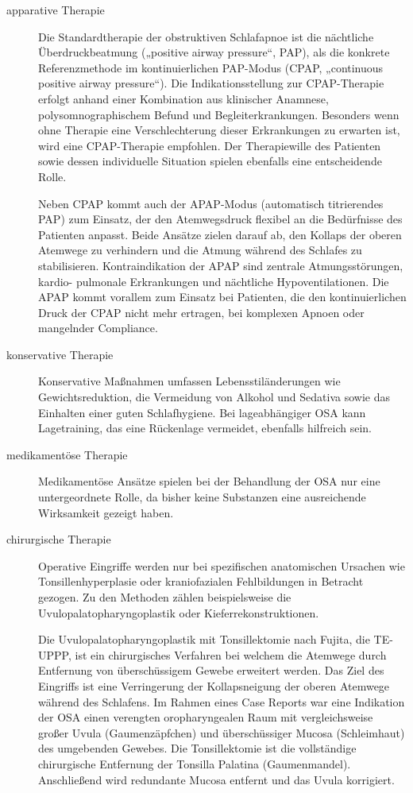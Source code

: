 \documentclass[a4paper, 12pt]{article}
\begin{document}
\begin{description}
    \item[apparative Therapie] Die Standardtherapie der obstruktiven Schlafapnoe ist die nächtliche Überdruckbeatmung („positive airway pressure“, PAP), als die konkrete Referenzmethode im kontinuierlichen PAP-Modus (CPAP, „continuous positive airway pressure“). Die Indikationsstellung zur CPAP-Therapie erfolgt anhand einer Kombination aus klinischer Anamnese, polysomnographischem Befund und Begleiterkrankungen. Besonders wenn ohne Therapie eine Verschlechterung dieser Erkrankungen zu erwarten ist, wird eine CPAP-Therapie empfohlen. Der Therapiewille des Patienten sowie dessen individuelle Situation spielen ebenfalls eine entscheidende Rolle.
    
    Neben CPAP kommt auch der APAP-Modus (automatisch titrierendes PAP) zum Einsatz, der den Atemwegsdruck flexibel an die Bedürfnisse des Patienten anpasst. Beide Ansätze zielen darauf ab, den Kollaps der oberen Atemwege zu verhindern und die Atmung während des Schlafes zu stabilisieren. Kontraindikation der APAP sind zentrale Atmungsstörungen, kardio- pulmonale Erkrankungen und nächtliche Hypoventilationen. Die APAP kommt vorallem zum Einsatz bei Patienten, die den kontinuierlichen Druck der CPAP nicht mehr ertragen, bei komplexen Apnoen oder mangelnder Compliance. 

    \item[konservative Therapie] Konservative Maßnahmen umfassen Lebensstiländerungen wie Gewichtsreduktion, die Vermeidung von Alkohol und Sedativa sowie das Einhalten einer guten Schlafhygiene. Bei lageabhängiger OSA kann Lagetraining, das eine Rückenlage vermeidet, ebenfalls hilfreich sein.

    \item[medikamentöse Therapie] Medikamentöse Ansätze spielen bei der Behandlung der OSA nur eine untergeordnete Rolle, da bisher keine Substanzen eine ausreichende Wirksamkeit gezeigt haben.

    \item[chirurgische Therapie] Operative Eingriffe werden nur bei spezifischen anatomischen Ursachen wie Tonsillenhyperplasie oder kraniofazialen Fehlbildungen in Betracht gezogen. Zu den Methoden zählen beispielsweise die Uvulopalatopharyngoplastik oder Kieferrekonstruktionen. 
    
    Die Uvulopalatopharyngoplastik mit Tonsillektomie nach Fujita, die TE-UPPP, ist ein chirurgisches Verfahren bei welchem die Atemwege durch Entfernung von überschüssigem Gewebe erweitert werden. Das Ziel des Eingriffs ist eine Verringerung der Kollapsneigung der oberen Atemwege während des Schlafens. Im Rahmen eines Case Reports war eine Indikation der OSA einen verengten oropharyngealen Raum mit vergleichsweise großer Uvula (Gaumenzäpfchen) und überschüssiger Mucosa (Schleimhaut) des umgebenden Gewebes. Die Tonsillektomie ist die vollständige chirurgische Entfernung der Tonsilla Palatina (Gaumenmandel). Anschließend wird redundante Mucosa entfernt und das Uvula korrigiert. \cite{Fujita_UPPP}
\end{description}
\end{document}
